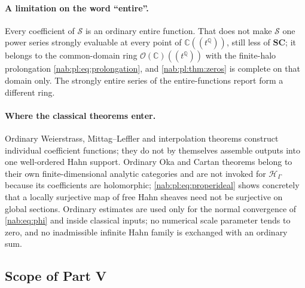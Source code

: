 \documentclass[11pt,letterpaper]{article}
\theoremstyle{definition}
\theoremstyle{remark}
\newcommand{\C}{\mathbb C}
\newcommand{\Q}{\mathbb Q}
\newcommand{\SC}{\mathbf{SC}}
\newcommand{\OO}{\mathcal O}
\newcommand{\HH}{\mathscr H_\Gamma}
\numberwithin{equation}{section}
\begin{document}
\paragraph{A limitation on the word ``entire''.} Every coefficient of
$\mathcal S$ is an ordinary entire function. That does not make $\mathcal S$ one
power series strongly evaluable at every point of $\C((t^\Q))$, still less of
$\SC$; it belongs to the common-domain ring $\OO(\C)((t^\Q))$ with the
finite-halo prolongation \eqref{nab:pl:eq:prolongation}, and
\cref{nab:pl:thm:zeros} is complete on that domain only. The strongly entire
series of the entire-functions report form a different ring.

\paragraph{Where the classical theorems enter.} Ordinary Weierstrass,
Mittag--Leffler and interpolation theorems construct individual coefficient
functions; they do not by themselves assemble outputs into one well-ordered
Hahn support. Ordinary Oka and Cartan theorems belong to their own
finite-dimensional analytic categories \cite{ForstnericPrezelj} and are not
invoked for $\HH$ because its coefficients are holomorphic;
\eqref{nab:pl:eq:properideal} shows concretely that a locally surjective map of
free Hahn sheaves need not be surjective on global sections. Ordinary estimates
are used only for the normal convergence of \eqref{nab:eq:phi} and inside
classical inputs; no numerical scale parameter tends to zero, and no
inadmissible infinite Hahn family is exchanged with an ordinary sum.

\subsection{Scope of Part V}\label{nab:pl:sub:scope}
\end{document}
